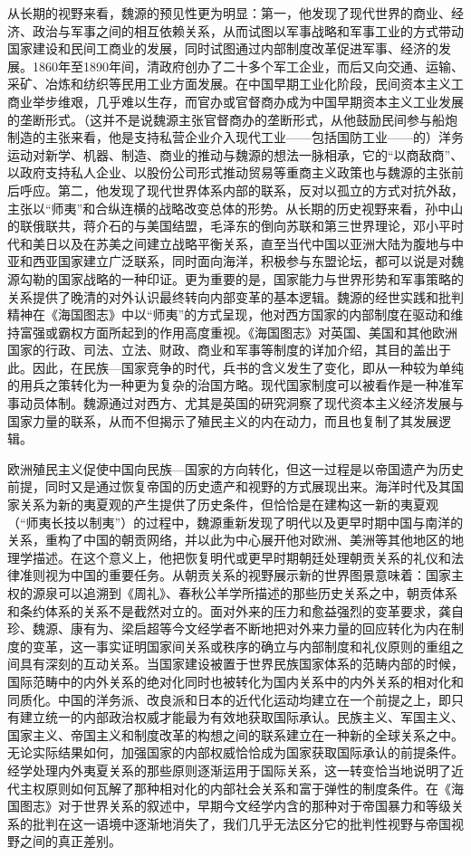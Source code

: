 \documentclass[a4paper, 12pt, openright]{ctexbook}
\begin{document}
从长期的视野来看，魏源的预见性更为明显：第一，他发现了现代世界的商业、经济、政治与军事之间的相互依赖关系，从而试图以军事战略和军事工业的方式带动国家建设和民间工商业的发展，同时试图通过内部制度改革促进军事、经济的发展。1860年至1890年间，清政府创办了二十多个军工企业，而后又向交通、运输、采矿、冶炼和纺织等民用工业方面发展。在中国早期工业化阶段，民间资本主义工商业举步维艰，几乎难以生存，而官办或官督商办成为中国早期资本主义工业发展的垄断形式。（这并不是说魏源主张官督商办的垄断形式，从他鼓励民间参与船炮制造的主张来看，他是支持私营企业介入现代工业——包括国防工业——的）洋务运动对新学、机器、制造、商业的推动与魏源的想法一脉相承，它的“以商敌商”、以政府支持私人企业、以股份公司形式推动贸易等重商主义政策也与魏源的主张前后呼应。第二，他发现了现代世界体系内部的联系，反对以孤立的方式对抗外敌，主张以“师夷”和合纵连横的战略改变总体的形势。从长期的历史视野来看，孙中山的联俄联共，蒋介石的与美国结盟，毛泽东的倒向苏联和第三世界理论，邓小平时代和美日以及在苏美之间建立战略平衡关系，直至当代中国以亚洲大陆为腹地与中亚和西亚国家建立广泛联系，同时面向海洋，积极参与东盟论坛，都可以说是对魏源勾勒的国家战略的一种印证。更为重要的是，国家能力与世界形势和军事策略的关系提供了晚清的对外认识最终转向内部变革的基本逻辑。魏源的经世实践和批判精神在《海国图志》中以“师夷”的方式呈现，他对西方国家的内部制度在驱动和维持富强或霸权方面所起到的作用高度重视。《海国图志》对英国、美国和其他欧洲国家的行政、司法、立法、财政、商业和军事等制度的详加介绍，其目的盖出于此。因此，在民族—国家竞争的时代，兵书的含义发生了变化，即从一种较为单纯的用兵之策转化为一种更为复杂的治国方略。现代国家制度可以被看作是一种准军事动员体制。魏源通过对西方、尤其是英国的研究洞察了现代资本主义经济发展与国家力量的联系，从而不但揭示了殖民主义的内在动力，而且也复制了其发展逻辑。

欧洲殖民主义促使中国向民族—国家的方向转化，但这一过程是以帝国遗产为历史前提，同时又是通过恢复帝国的历史遗产和视野的方式展现出来。海洋时代及其国家关系为新的夷夏观的产生提供了历史条件，但恰恰是在建构这一新的夷夏观（“师夷长技以制夷”）的过程中，魏源重新发现了明代以及更早时期中国与南洋的关系，重构了中国的朝贡网络，并以此为中心展开他对欧洲、美洲等其他地区的地理学描述。在这个意义上，他把恢复明代或更早时期朝廷处理朝贡关系的礼仪和法律准则视为中国的重要任务。从朝贡关系的视野展示新的世界图景意味着：国家主权的源泉可以追溯到《周礼》、春秋公羊学所描述的那些历史关系之中，朝贡体系和条约体系的关系不是截然对立的。面对外来的压力和愈益强烈的变革要求，龚自珍、魏源、康有为、梁启超等今文经学者不断地把对外来力量的回应转化为内在制度的变革，这一事实证明国家间关系或秩序的确立与内部制度和礼仪原则的重组之间具有深刻的互动关系。当国家建设被置于世界民族国家体系的范畴内部的时候，国际范畴中的内外关系的绝对化同时也被转化为国内关系中的内外关系的相对化和同质化。中国的洋务派、改良派和日本的近代化运动均建立在一个前提之上，即只有建立统一的内部政治权威才能最为有效地获取国际承认。民族主义、军国主义、国家主义、帝国主义和制度改革的构想之间的联系建立在一种新的全球关系之中。无论实际结果如何，加强国家的内部权威恰恰成为国家获取国际承认的前提条件。经学处理内外夷夏关系的那些原则逐渐运用于国际关系，这一转变恰当地说明了近代主权原则如何瓦解了那种相对化的内部社会关系和富于弹性的制度条件。在《海国图志》对于世界关系的叙述中，早期今文经学内含的那种对于帝国暴力和等级关系的批判在这一语境中逐渐地消失了，我们几乎无法区分它的批判性视野与帝国视野之间的真正差别。
\end{document}

